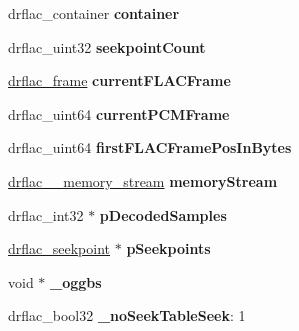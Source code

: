 \begin{DoxyCompactItemize}
\item 
\hypertarget{structdrflac_afa8e720fd607f10a1b6d0aa52426b062}{drflac\-\_\-container {\bfseries container}}\label{structdrflac_afa8e720fd607f10a1b6d0aa52426b062}

\item 
\hypertarget{structdrflac_a4e58913b777387919567bff6ead5b7a1}{drflac\-\_\-uint32 {\bfseries seekpoint\-Count}}\label{structdrflac_a4e58913b777387919567bff6ead5b7a1}

\item 
\hypertarget{structdrflac_aa9d3ef0dd6ec40ad5bfd10b2f02407cd}{\hyperlink{structdrflac__frame}{drflac\-\_\-frame} {\bfseries current\-F\-L\-A\-C\-Frame}}\label{structdrflac_aa9d3ef0dd6ec40ad5bfd10b2f02407cd}

\item 
\hypertarget{structdrflac_ae76cb52fae538931af9208f17a48433c}{drflac\-\_\-uint64 {\bfseries current\-P\-C\-M\-Frame}}\label{structdrflac_ae76cb52fae538931af9208f17a48433c}

\item 
\hypertarget{structdrflac_adebf383439b4b4b6296e92a560e68c50}{drflac\-\_\-uint64 {\bfseries first\-F\-L\-A\-C\-Frame\-Pos\-In\-Bytes}}\label{structdrflac_adebf383439b4b4b6296e92a560e68c50}

\item 
\hypertarget{structdrflac_ab68b04e306280680cf0dc6af98362253}{\hyperlink{structdrflac____memory__stream}{drflac\-\_\-\-\_\-memory\-\_\-stream} {\bfseries memory\-Stream}}\label{structdrflac_ab68b04e306280680cf0dc6af98362253}

\item 
\hypertarget{structdrflac_a253f4a5bc2c27f6758ff123279cb50dd}{drflac\-\_\-int32 $\ast$ {\bfseries p\-Decoded\-Samples}}\label{structdrflac_a253f4a5bc2c27f6758ff123279cb50dd}

\item 
\hypertarget{structdrflac_a8109736bd2c564bec34fdfc578c91c4b}{\hyperlink{structdrflac__seekpoint}{drflac\-\_\-seekpoint} $\ast$ {\bfseries p\-Seekpoints}}\label{structdrflac_a8109736bd2c564bec34fdfc578c91c4b}

\item 
\hypertarget{structdrflac_a4d053bc5c3d5997fb5aa57ed486be33e}{void $\ast$ {\bfseries \-\_\-oggbs}}\label{structdrflac_a4d053bc5c3d5997fb5aa57ed486be33e}

\item 
\hypertarget{structdrflac_afbf95f837cda1547e31648956c465788}{drflac\-\_\-bool32 {\bfseries \-\_\-no\-Seek\-Table\-Seek}\-: 1}\label{structdrflac_afbf95f837cda1547e31648956c465788}


\end{DoxyCompactItemize}
